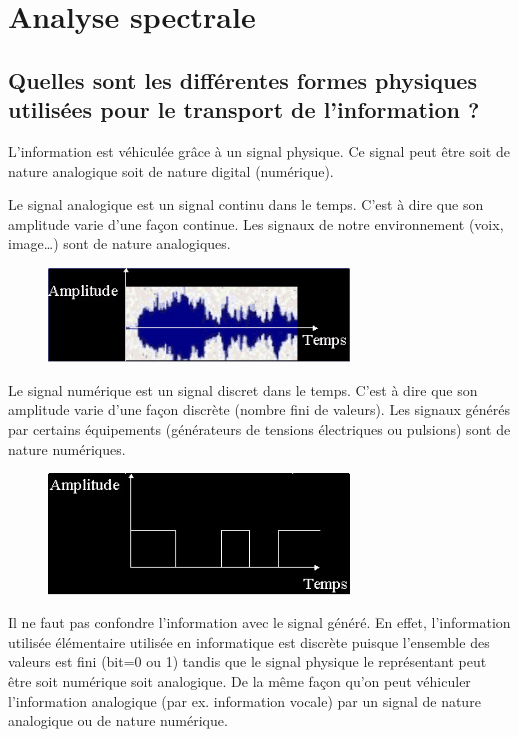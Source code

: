 \chapter{Analyse spectrale}
\section{Quelles sont les différentes formes physiques utilisées pour le transport de l'information ?}
L'information est véhiculée grâce à un signal physique. Ce signal peut être soit de nature
analogique soit de nature digital (numérique).

Le signal analogique est un signal continu dans le temps. C'est à dire que son amplitude varie
d'une façon continue. Les signaux de notre environnement (voix, image\ldots) sont de nature
analogiques.

\begin{figure}[H]
	\centering
	\includegraphics[width=8cm]{partie2/signalanalog.jpg}
\end{figure}

Le signal numérique est un signal discret dans le temps. C'est à dire que son amplitude varie
d'une façon discrète (nombre fini de valeurs). Les signaux générés par certains équipements
(générateurs de tensions électriques ou pulsions) sont de nature numériques.

\begin{figure}[H]
	\centering
	\includegraphics[width=8cm]{partie2/signaldigit.jpg}
\end{figure}
Il ne faut pas confondre l'information avec le signal généré. En effet, l'information utilisée
élémentaire utilisée en informatique est discrète puisque l'ensemble des valeurs est fini
(bit=0 ou 1) tandis que le signal physique le représentant peut être soit numérique soit
analogique. De la même façon qu'on peut véhiculer l'information analogique (par ex.
information vocale) par un signal de nature analogique ou de nature numérique.

